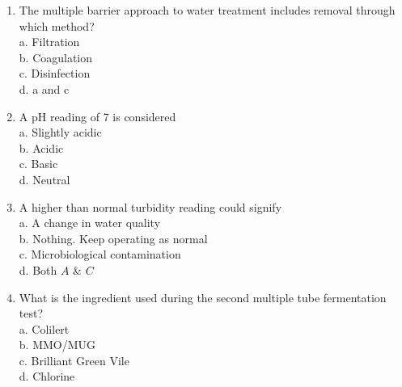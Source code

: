 \documentclass[10pt]{article}
\begin{document}
\begin{enumerate}
  \item The multiple barrier approach to water treatment includes removal through which method?\\
a. Filtration\\
b. Coagulation\\
c. Disinfection\\
d. a and c

  \item A pH reading of 7 is considered\\
a. Slightly acidic\\
b. Acidic\\
c. Basic\\
d. Neutral

  \item A higher than normal turbidity reading could signify\\
a. A change in water quality\\
b. Nothing. Keep operating as normal\\
c. Microbiological contamination\\
d. Both $A$ \& $C$

  \item What is the ingredient used during the second multiple tube fermentation test?\\
a. Colilert\\
b. MMO/MUG\\
c. Brilliant Green Vile\\
d. Chlorine

\end{enumerate}
\end{document}
